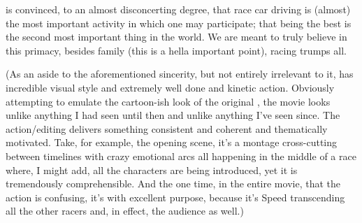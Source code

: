 \documentclass[../butidigress.tex]{subfiles}
\begin{document}
 is convinced, to an almost disconcerting degree, that race car driving is (almost) the most important activity in which one may participate; that being the best is the second most important thing in the world.
We are meant to truly believe in this primacy, besides family (this is a hella important point), racing trumps all.


(As an aside to the aforementioned sincerity, but not entirely irrelevant to it,  has incredible visual style and extremely well done and kinetic action.
Obviously attempting to emulate the cartoon-ish look of the original , the movie looks unlike anything I had seen until then and unlike anything I've seen since.
The action/editing delivers something consistent and coherent and thematically motivated.
Take, for example, the opening scene, it's a montage cross-cutting between timelines with crazy emotional arcs all happening in the middle of a race where, I might add, all the characters are being introduced, yet it is tremendously comprehensible.
And the one time, in the entire movie, that the action is confusing, it's with excellent purpose, because it's Speed transcending all the other racers and, in effect, the audience as well.)
\end{document}
